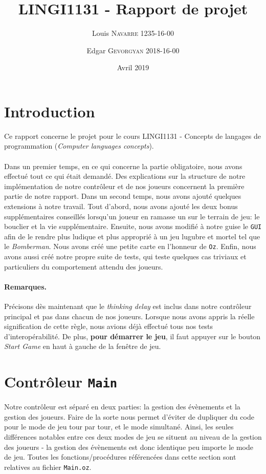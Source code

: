 \documentclass{article}
\title{LINGI1131 - Rapport de projet}
\author{Louis \textsc{Navarre} 1235-16-00 \and Edgar \textsc{Gevorgyan} 2018-16-00}
\date{Avril 2019}
\begin{document}
\maketitle

\section{Introduction}
Ce rapport concerne le projet pour le cours LINGI1131 - Concepts de langages de programmation (\emph{Computer languages concepts}). \\ \\
Dans un premier temps, en ce qui concerne la partie obligatoire, nous avons effectué tout ce qui était demandé. Des explications sur la structure de notre implémentation de notre contrôleur et de nos joueurs concernent la première partie de notre rapport. Dans un second temps, nous avons ajouté quelques extensions à notre travail. Tout d'abord, nous avons ajouté les deux bonus supplémentaires conseillés lorsqu'un joueur en ramasse un sur le terrain de jeu: le bouclier et la vie supplémentaire. Ensuite, nous avons modifié à notre guise le \texttt{GUI} afin de le rendre plus ludique et plus approprié à un jeu lugubre et mortel tel que le \emph{Bomberman}. Nous avons créé une petite carte en l'honneur de \texttt{Oz}. Enfin, nous avons aussi créé notre propre suite de tests, qui teste quelques cas triviaux et particuliers du comportement attendu des joueurs.
\paragraph{Remarques.}Précisons dès maintenant que le \emph{thinking delay} est inclus dans notre contrôleur principal et pas dans chacun de nos joueurs. Lorsque nous avons appris la réelle signification de cette règle, nous avions déjà effectué tous nos tests d'interopérabilité. De plus, \textbf{pour démarrer le jeu}, il faut appuyer sur le bouton \emph{Start Game} en haut à gauche de la fenêtre de jeu.

\section{Contrôleur \texttt{Main}}
Notre contrôleur est séparé en deux parties: la gestion des évènements et la gestion des joueurs. Faire de la sorte nous permet d'éviter de dupliquer du code pour le mode de jeu tour par tour, et le mode simultané. Ainsi, les seules différences notables entre ces deux modes de jeu se situent au niveau de la gestion des joueurs - la gestion des évènements est donc identique peu importe le mode de jeu. Toutes les fonctions/procédures référencées dans cette section sont relatives au fichier \texttt{Main.oz}.
\end{document}
